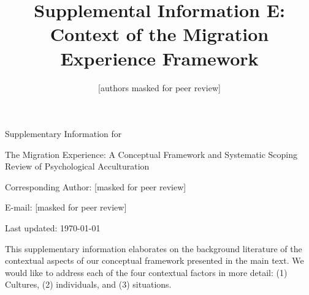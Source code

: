 \documentclass[man, 12pt, a4paper]{apa7}
\title{Supplemental Information E: Context of the Migration Experience Framework}
\author{[authors masked for peer review]}
\begin{document}
\begin{titlepage}
	{\noindent\Large Supplementary Information for \par}
	\vspace{0.5cm}
	{\noindent\Large The Migration Experience: A Conceptual Framework and Systematic Scoping Review of Psychological Acculturation\par}
	\vspace{1.5cm}
	{\noindent\LARGE\bfseries \thetitle \par}
	\vspace{2cm}
	{\noindent\Large\itshape \theauthor \par}
	\vfill
	\noindent Corresponding Author: [masked for peer review]\par
	\noindent E-mail: [masked for peer review]\par
	\vfill

	{\noindent Last updated: \today\par}
\end{titlepage}

\begin{center}
   \textbf{\thetitle} 
\end{center}

This supplementary information elaborates on the background literature of the contextual aspects of our conceptual framework presented in the main text. We would like to address each of the four contextual factors in more detail: (1) Cultures, (2) individuals, and (3) situations.

\end{document}
